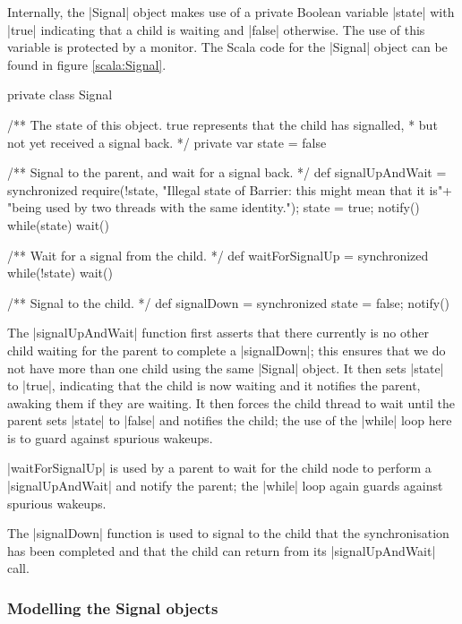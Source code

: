Internally, the |Signal| object makes use of a private Boolean variable |state| with |true| indicating that a child is waiting and |false| otherwise. The use of this variable is protected by a monitor. The Scala code for the |Signal| object can be found in figure \ref{scala:Signal}.
\newpage 
\begin{scala}[label=scala:Signal, caption={The Scala code for the {\scalastyle Signal} object}]
private class Signal{
  /** The state of this object.  true represents that the child has signalled,
    * but not yet received a signal back. */
  private var state = false

  /** Signal to the parent, and wait for a signal back. */
  def signalUpAndWait = synchronized{
    require(!state, 
      "Illegal state of Barrier: this might mean that it is\n"+
      "being used by two threads with the same identity.");
    state = true; notify()
    while(state) wait()
  }

  /** Wait for a signal from the child. */
  def waitForSignalUp = synchronized{ while(!state) wait() }

  /** Signal to the child. */
  def signalDown = synchronized{ state = false; notify() }
}
\end{scala}

The |signalUpAndWait| function first asserts that there currently is no other child waiting for the parent to complete a |signalDown|; this ensures that we do not have more than one child using the same |Signal| object. It then sets |state| to |true|, indicating that the child is now waiting and it notifies the parent, awaking them if they are waiting. It then forces the child thread to wait until the parent sets |state| to |false| and notifies the child; the use of the |while| loop here is to guard against spurious wakeups.

|waitForSignalUp| is used by a parent to wait for the child node to perform a |signalUpAndWait| and notify the parent; the |while| loop again guards against spurious wakeups.

The |signalDown| function is used to signal to the child that the synchronisation has been completed and that the child can return from its |signalUpAndWait| call.

\subsubsection{Modelling the Signal objects}


